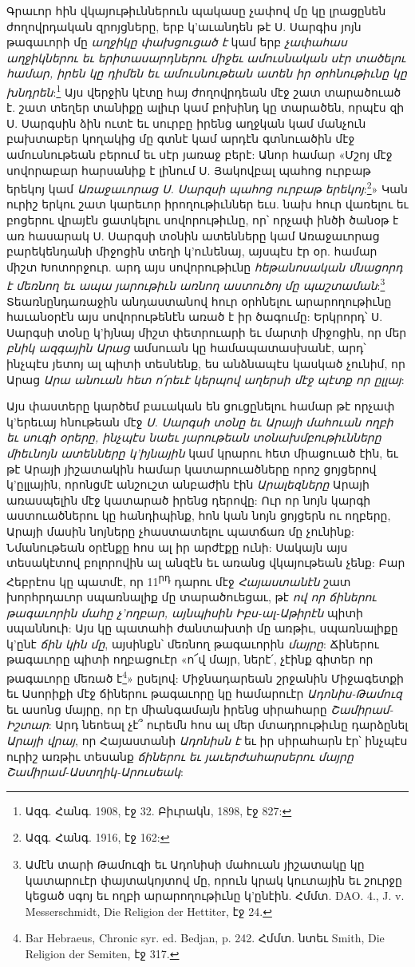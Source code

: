 \documentclass{article}
\begin{document}
{Գրաւոր հին վկայութիւններուն պակասը չափով մը կը լրացընեն ժողովրդական զրոյցները, երբ կ'աւանդեն թէ Ս. Սարգիս յոյն թագաւորի մը \emph{աղջիկը փախցուցած է} կամ երբ \emph{չափահաս աղջիկներու եւ երիտասարդներու միջեւ ամուսնական սէր տածելու համար, իրեն կը դիմեն եւ ամուսնութեան ատեն իր օրհնութիւնը կը խնդրեն}:\footnote{Ազգ. Հանգ. 1908, էջ 32. Բիւրակն, 1898, էջ 827:} Այս վերջին կէտը հայ ժողովրդեան մէջ շատ տարածուած է. շատ տեղեր տանիքը ալիւր կամ բոխինդ կը տարածեն, որպէս զի Ս. Սարգսին ձին ուտէ եւ սուրբը իրենց աղջկան կամ մանչուն բախտաբեր կողակից մը գտնէ կամ արդէն գտնուածին մէջ ամուսնութեան բերում եւ սէր յառաջ բերէ: Անոր համար «Մշոյ մէջ սովորաբար հարսանիք է լինում Ս. Յակովբալ պահոց ուրբաթ երեկոյ կամ \emph{Առաջաւորաց Ս. Սարզսի պահոց ուրբաթ երեկոյ}:\footnote{Ազգ. Հանգ. 1916, էջ 162:}» Կան ուրիշ երկու շատ կարեւոր իրողութիւններ եւս. նախ հուր վառելու եւ բոցերու վրայէն ցատկելու սովորութիւնը, որ՝ որչափ ինծի ծանօթ է առ հասարակ Ս. Սարգսի տօնին ատենները կամ Առաջաւորաց բարեկենդանի միջոցին տեղի կ'ունենայ, այսպէս էր օր. համար միշտ Խոտորջուր. արդ այս սովորութիւնը \emph{հեթանոսական մնացորդ է մեռնող եւ ապա յարութիւն առնող աստուծոյ մը պաշտաման}:\footnote{Ամէն տարի Թամուզի եւ Ադոնիսի մահուան յիշատակը կը կատարուէր փայտակոյտով մը, որուն կրակ կուտային եւ շուրջը կեցած սգոյ եւ ողբի արարողութիւնը կ'ընէին. Հմմտ. DAO. 4., J. v. Messerschmidt, Die Religion der Hettiter, էջ 24.} Տեառնընդառաջին անդաստանով հուր օրհնելու արարողութիւնը հաւանօրէն այս սովորութենէն առած է իր ծագումը: Երկրորդ՝ Ս. Սարգսի տօնը կ'իյնայ միշտ փետրուարի եւ մարտի միջոցին, որ մեր \emph{բնիկ ազգային Արաց} ամսուան կը համապատասխանէ, արդ՝ ինչպէս յետոյ ալ պիտի տեսնենք, ես անձնապէս կասկած չունիմ, որ Արաց \emph{Արա անուան հետ ո՛րեւէ կերպով աղերսի մէջ պէտք որ ըլլայ}:

Այս փաստերը կարծեմ բաւական են ցուցընելու համար թէ որչափ կ'երեւայ հնութեան մէջ \emph{Ս. Սարգսի տօնը եւ Արայի մահուան ողբի եւ սուգի օրերը, ինչպէս նաեւ յարութեան տօնախմբութիւնները միեւնոյն ատենները կ'իյնային} կամ կրարու հետ միացուած էին, եւ թէ Արայի յիշատակին համար կատարուածները որոշ ցոյցերով կ'ըլլային, որոնցմէ անշուշտ անբաժին էին \emph{Արալեզները} Արայի առասպելին մէջ կատարած իրենց դերովը: Ուր որ նոյն կարգի աստուածներու կը հանդիպինք, հոն կան նոյն ցոյցերն ու ողբերը, Արայի մասին նոյները չհաստատելու պատճառ մը չունինք: Նմանութեան օրէնքը հոս ալ իր արժէքը ունի: Սակայն այս տեսակէտով բոլորովին ալ անզէն եւ առանց վկայութեան չենք: Բար Հեբրէոս կը պատմէ, որ 11\textsuperscript{րդ} դարու մէջ \emph{Հայաստանէն} շատ խորհրդաւոր սպառնալիք մը տարածուեցաւ, թէ \emph{ով որ ճիներու թագաւորին մահը չ'ողբար, այնպիսին Իբս-ալ-Աթիրէն} պիտի սպաննուի: Այս կը պատահի ժանտախտի մը առթիւ, սպառնալիքը կ'ընէ \emph{ճին կին մը}, այսինքն՝ մեռնող թագաւորին \emph{մայրը}: Ճիներու թագաւորը պիտի ողբացուէր «ո՜վ մայր, ներէ՛, չէինք գիտեր որ թագաւորը մեռած է\footnote{Bar Hebraeus, Chronic syr. ed. Bedjan, p. 242. Հմմտ. նտեւ Smith, Die Religion der Semiten, էջ 317.}» ըսելով: Միջնադարեան շրջանին Միջագետքի եւ Ասորիքի մէջ ճիներու թագաւորը կը համարուէր \emph{Ադոնիս-Թամուզ} եւ ասոնց մայրը, որ էր միանգամայն իրենց սիրահարը \emph{Շամիրամ-Իշտար}: Արդ նեոեալ չէ՞ ուրեմն հոս ալ մեր մտադրութիւնը դարձընել \emph{Արայի վրայ}, որ Հայաստանի \emph{Ադոնիսն է} եւ իր սիրահարն էր՝ ինչպէս ուրիշ առթիւ տեսանք \emph{ճիներու եւ յաւերժահարսերու մայրը Շամիրամ-Աստղիկ-Արուսեակ}:

}
\end{document}
